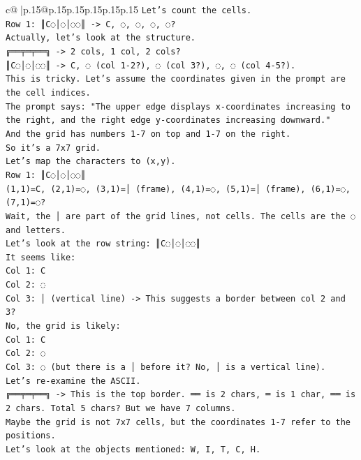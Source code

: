 \documentclass{article}
\begin{document}
{\begin{supertabular}{c@{$\;$}|p{.15\linewidth}@{}p{.15\linewidth}p{.15\linewidth}p{.15\linewidth}p{.15\linewidth}p{.15\linewidth}}
{{{\texttt{Let's count the cells.} \\
\texttt{Row 1: ║C◌│◌│◌◌║ {-}> C, ◌, ◌, ◌, ◌?} \\
\texttt{Actually, let's look at the structure.} \\
\texttt{╔══╤═╤══╗ {-}> 2 cols, 1 col, 2 cols?} \\
\texttt{║C◌│◌│◌◌║ {-}> C, ◌ (col 1{-}2?), ◌ (col 3?), ◌, ◌ (col 4{-}5?).} \\
\texttt{This is tricky. Let's assume the coordinates given in the prompt are the cell indices.} \\
\texttt{The prompt says: "The upper edge displays x{-}coordinates increasing to the right, and the right edge y{-}coordinates increasing downward."} \\
\texttt{And the grid has numbers 1{-}7 on top and 1{-}7 on the right.} \\
\texttt{So it's a 7x7 grid.} \\
\texttt{Let's map the characters to (x,y).} \\
\texttt{Row 1: ║C◌│◌│◌◌║} \\
\texttt{(1,1)=C, (2,1)=◌, (3,1)=│ (frame), (4,1)=◌, (5,1)=│ (frame), (6,1)=◌, (7,1)=◌?} \\
\texttt{Wait, the │ are part of the grid lines, not cells. The cells are the ◌ and letters.} \\
\texttt{Let's look at the row string: ║C◌│◌│◌◌║} \\
\texttt{It seems like:} \\
\texttt{Col 1: C} \\
\texttt{Col 2: ◌} \\
\texttt{Col 3: │ (vertical line) {-}> This suggests a border between col 2 and 3?} \\
\texttt{No, the grid is likely:} \\
\texttt{Col 1: C} \\
\texttt{Col 2: ◌} \\
\texttt{Col 3: ◌ (but there is a │ before it? No, │ is a vertical line).} \\
\texttt{Let's re{-}examine the ASCII.} \\
\texttt{╔══╤═╤══╗ {-}> This is the top border. ══ is 2 chars, ═ is 1 char, ══ is 2 chars. Total 5 chars? But we have 7 columns.} \\
\texttt{Maybe the grid is not 7x7 cells, but the coordinates 1{-}7 refer to the positions.} \\
\texttt{Let's look at the objects mentioned: W, I, T, C, H.} \\
}}}
\end{supertabular}}
\end{document}
